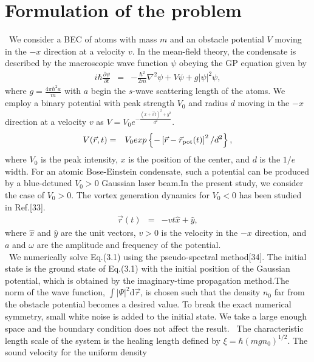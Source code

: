 \documentclass[12pt,a4paper]{report}
\newcommand{\diff}{\mathrm{d}}				            %
\begin{document}
\section{Formulation of the problem}
\ We consider a BEC of atoms with mass $m$ and an obstacle potential $V$
moving in the $-x$ direction at a velocity $v$. In the mean-field theory,
the condensate is described by the macroscopic wave function $\psi$ obeying
the GP equation given by
\begin{eqnarray}
i \hbar \frac{\partial \psi}{\partial t} & = &
- \frac{\hbar^2}{2m} \nabla^2 \psi + V \psi + g | \psi |^2 \psi,
\end{eqnarray}
where $\displaystyle g = \frac{4 \pi \hbar^2 a}{m}$ with $a$ begin the 
$s$-wave scattering length of the atoms. We employ a binary potential with
peak strength $V_0$ and radius $d$ moving in the $-x$ direction
at a velocity $v$ as $V = V_0 e^{-\frac{(x+\vec{v}t)^2+y^2}{d^2}}$.
\\
\begin{eqnarray}
V( \vec{r}, t ) & = & V_0 exp 
\left\{
- \left[
\vec{r} - \vec{r}_{{\rm pot}} (t)
\right]^2 /d^2
\right\},
\end{eqnarray}
where $V_0$ is the peak intensity, $x$ is the position of the center, and $d$ is the $1/e$ width.
For an atomic Bose-Einstein condensate, such a potential can be produced by a blue-detuned $V_0 > 0$
Gaussian laser beam.In the present study, we consider the case of $V_0 > 0$.
The vortex generation dynamics for $V_0 < 0$ has been studied in Ref.[33].
\begin{eqnarray}
\vec{r} (t) & = & - v t \hat{x} + \hat{y},
\end{eqnarray}
where $\hat{x}$ and $\hat{y}$ are the unit vectors, $v > 0$ is the velocity in the $-x$ direction,
and $a$ and $\omega$ are the amplitude and frequency of the potential.
\\
\ We numerically solve Eq.(3.1) using the pseudo-spectral method[34]. The initial state is the ground state
of Eq.(3.1) with the initial position of the Gaussian potential, which is obtained by the
imaginary-time propagation method.The norm of the wave function, $\int |\Psi|^2 \diff \vec{r}$, is
chosen such that the density $n_0$ far from the obstacle potential becomes a desired value.
To break the exact numerical symmetry, small white noise is added to the initial state.
We take a large enough space and the boundary condition does not affect the result.
\ The characteristic length scale of the system is the healing length defined by
$\xi = \hbar(mg n_0)^{1/2}$. The sound velocity for the uniform density 
\end{document}
